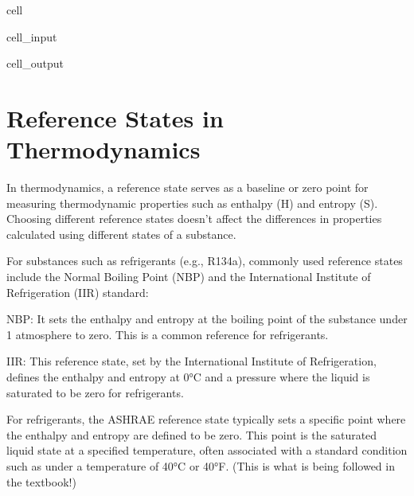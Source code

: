 \documentclass[letterpaper,10pt,english]{jupyterBook}
\begin{document}
\begin{sphinxuseclass}{cell}
\begin{sphinxVerbatimInput}
\begin{sphinxuseclass}{cell_input}
\begin{sphinxVerbatim}[commandchars=\\\{\}]
  

\end{sphinxVerbatim}

\end{sphinxuseclass}\end{sphinxVerbatimInput}
\begin{sphinxVerbatimOutput}

\begin{sphinxuseclass}{cell_output}
\noindent{}

\end{sphinxuseclass}\end{sphinxVerbatimOutput}

\end{sphinxuseclass}
\sphinxstepscope


\section{Reference States in Thermodynamics}
\label{\detokenize{notebooks/Chapter4/use_different_references_in_CoolProp:reference-states-in-thermodynamics}}\label{\detokenize{notebooks/Chapter4/use_different_references_in_CoolProp::doc}}
\sphinxAtStartPar
In thermodynamics, a reference state serves as a baseline or zero point for measuring thermodynamic properties such as enthalpy (H) and entropy (S). Choosing different reference states doesn’t affect the differences in properties calculated using different states of a substance.

\sphinxAtStartPar
For substances such as refrigerants (e.g., R\sphinxhyphen{}134a), commonly used reference states include the Normal Boiling Point (NBP) and the International Institute of Refrigeration (IIR) standard:

\begin{sphinxVerbatim}[commandchars=\\\{\}]
NBP: It sets the enthalpy and entropy at the boiling point of the substance under 1 atmosphere to zero. This is a common reference for refrigerants.

IIR: This reference state, set by the International Institute of Refrigeration, defines the enthalpy and entropy at 0°C and a pressure where the liquid is saturated to be zero for refrigerants.

For refrigerants, the ASHRAE reference state typically sets a specific point where the enthalpy and entropy are defined to be zero. This point is the saturated liquid state at a specified temperature, often associated with a standard condition such as under a temperature of \PYGZhy{}40°C or \PYGZhy{}40°F. (This is what is being followed in the textbook!)
\end{sphinxVerbatim}
\end{document}
